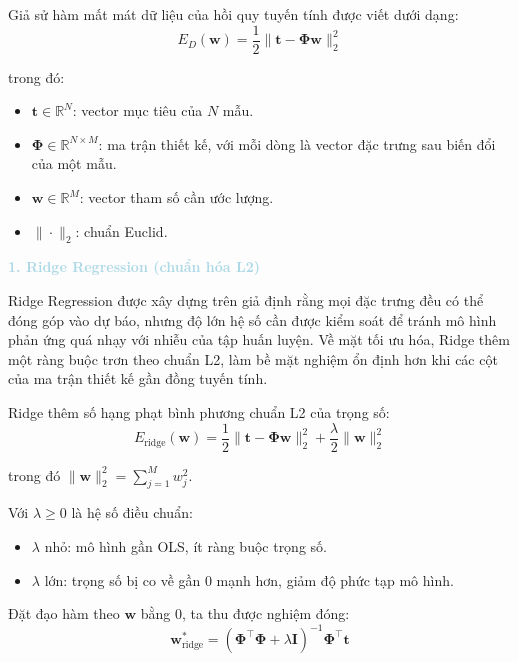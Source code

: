 Giả sử hàm mất mát dữ liệu của hồi quy tuyến tính được viết dưới dạng:
\begin{equation}
E_D(\mathbf{w}) = \frac{1}{2}\|\mathbf{t} - \mathbf{\Phi}\mathbf{w}\|_2^2
\end{equation}

trong đó: 
\begin{itemize} [labelsep=10pt, leftmargin=2cm]
    \item $\mathbf{t} \in \mathbb{R}^{N}$: vector mục tiêu của $N$ mẫu.
    \item $\mathbf{\Phi} \in \mathbb{R}^{N\times M}$: ma trận thiết kế, với mỗi dòng là vector đặc trưng sau biến đổi của một mẫu.
    \item $\mathbf{w} \in \mathbb{R}^{M}$: vector tham số cần ước lượng.
    \item $\|\cdot\|_2$: chuẩn Euclid.
\end{itemize}

\noindent\textcolor{lightblue}{\textbf{1. Ridge Regression (chuẩn hóa L2)}}

Ridge Regression được xây dựng trên giả định rằng mọi đặc trưng đều có thể đóng góp vào dự báo,
nhưng độ lớn hệ số cần được kiểm soát để tránh mô hình phản ứng quá nhạy với nhiễu của tập huấn luyện.
Về mặt tối ưu hóa, Ridge thêm một ràng buộc trơn theo chuẩn L2, làm bề mặt nghiệm ổn định hơn khi
các cột của ma trận thiết kế gần đồng tuyến tính.

Ridge thêm số hạng phạt bình phương chuẩn L2 của trọng số:
\begin{equation}
E_{\text{ridge}}(\mathbf{w}) = \frac{1}{2}\|\mathbf{t} - \mathbf{\Phi}\mathbf{w}\|_2^2
+ \frac{\lambda}{2}\|\mathbf{w}\|_2^2
\label{eq:ridge_obj}
\end{equation}

trong đó $\|\mathbf{w}\|_2^2 = \sum_{j=1}^{M}w_j^2$.

Với $\lambda \ge 0$ là hệ số điều chuẩn:
\begin{itemize} [labelsep=10pt, leftmargin=2cm]
    \item $\lambda$ nhỏ: mô hình gần OLS, ít ràng buộc trọng số.
    \item $\lambda$ lớn: trọng số bị co về gần 0 mạnh hơn, giảm độ phức tạp mô hình.
\end{itemize}

Đặt đạo hàm theo $\mathbf{w}$ bằng 0, ta thu được nghiệm đóng:
\begin{equation}
\mathbf{w}_{\text{ridge}}^{\ast} =
\left(\mathbf{\Phi}^{\top}\mathbf{\Phi}+\lambda\mathbf{I}\right)^{-1}\mathbf{\Phi}^{\top}\mathbf{t}
\label{eq:ridge_solution}
\end{equation}

